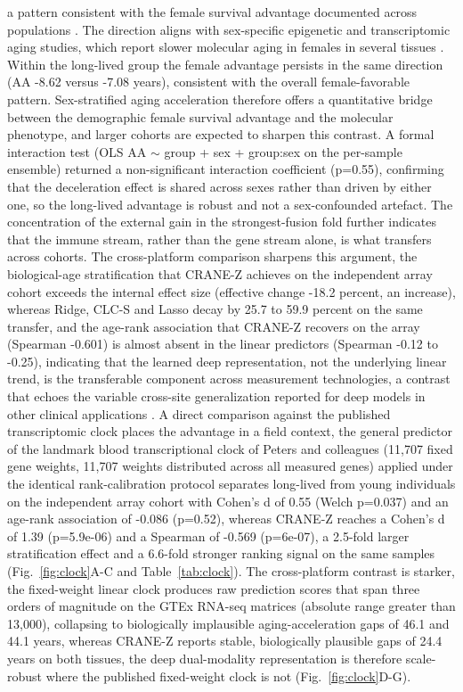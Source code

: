 \documentclass[unnumsec,webpdf,contemporary,large]{oup-authoring-template}
\begin{document}
a pattern consistent with the female survival advantage documented across populations \cite{austad_2006}. The direction aligns with sex-specific epigenetic and transcriptomic aging studies, which report slower molecular aging in females in several tissues \cite{hagg_2021}. Within the long-lived group the female advantage persists in the same direction (AA -8.62 versus -7.08 years), consistent with the overall female-favorable pattern. Sex-stratified aging acceleration therefore offers a quantitative bridge between the demographic female survival advantage and the molecular phenotype, and larger cohorts are expected to sharpen this contrast. A formal interaction test (OLS AA $\sim$ group + sex + group:sex on the per-sample ensemble) returned a non-significant interaction coefficient (p=0.55), confirming that the deceleration effect is shared across sexes rather than driven by either one, so the long-lived advantage is robust and not a sex-confounded artefact. The concentration of the external gain in the strongest-fusion fold further indicates that the immune stream, rather than the gene stream alone, is what transfers across cohorts. The cross-platform comparison sharpens this argument, the biological-age stratification that CRANE-Z achieves on the independent array cohort exceeds the internal effect size (effective change -18.2 percent, an increase), whereas Ridge, CLC-S and Lasso decay by 25.7 to 59.9 percent on the same transfer, and the age-rank association that CRANE-Z recovers on the array (Spearman -0.601) is almost absent in the linear predictors (Spearman -0.12 to -0.25), indicating that the learned deep representation, not the underlying linear trend, is the transferable component across measurement technologies, a contrast that echoes the variable cross-site generalization reported for deep models in other clinical applications \cite{zech2018variable}. A direct comparison against the published transcriptomic clock places the advantage in a field context, the general predictor of the landmark blood transcriptional clock of Peters and colleagues (11,707 fixed gene weights, 11,707 weights distributed across all measured genes) applied under the identical rank-calibration protocol separates long-lived from young individuals on the independent array cohort with Cohen's d of 0.55 (Welch p=0.037) and an age-rank association of -0.086 (p=0.52), whereas CRANE-Z reaches a Cohen's d of 1.39 (p=5.9e-06) and a Spearman of -0.569 (p=6e-07), a 2.5-fold larger stratification effect and a 6.6-fold stronger ranking signal on the same samples (Fig.~\ref{fig:clock}A-C and Table~\ref{tab:clock}). The cross-platform contrast is starker, the fixed-weight linear clock produces raw prediction scores that span three orders of magnitude on the GTEx RNA-seq matrices (absolute range greater than 13,000), collapsing to biologically implausible aging-acceleration gaps of 46.1 and 44.1 years, whereas CRANE-Z reports stable, biologically plausible gaps of 24.4 years on both tissues, the deep dual-modality representation is therefore scale-robust where the published fixed-weight clock is not (Fig.~\ref{fig:clock}D-G).
\end{document}
